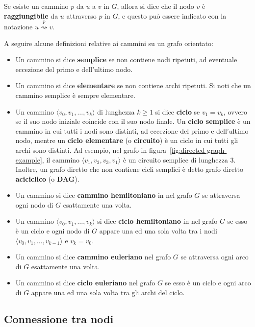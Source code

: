 Se esiste un cammino $p$ da $u$ a $v$ in $G$, allora si dice che il nodo $v$ \`e \textbf{raggiungibile} da $u$
attraverso $p$ in $G$, e questo pu\`o essere indicato con la notazione $u \overset{p}{\rightsquigarrow} v$. \newline

A seguire alcune definizioni relative ai cammini su un grafo orientato:

\begin{itemize}
    \item Un cammino si dice \textbf{semplice} se non contiene nodi ripetuti, ad eventuale eccezione del primo e
    dell'ultimo nodo.
    \item Un cammino si dice \textbf{elementare} se non contiene archi ripetuti. Si noti che un cammino semplice \`e
    sempre elementare.
    \item Un cammino $\langle v_0, v_1, \ldots, v_k \rangle$ di lunghezza $k \geq 1$ si dice \textbf{ciclo} se $v_1 = v_k$, ovvero se il
    suo nodo iniziale coincide con il suo nodo finale.
    Un \textbf{ciclo semplice} \`e un cammino in cui tutti i nodi sono distinti, ad eccezione del primo e dell'ultimo
    nodo, mentre un \textbf{ciclo elementare} (o \textbf{circuito}) \`e un ciclo in cui tutti gli archi sono distinti.
    Ad esempio, nel grafo in figura~\ref{fig:directed-graph-example}, il cammino $\langle v_1, v_2, v_3, v_1 \rangle$
    \`e un circuito semplice di lunghezza 3.
    Inoltre, un grafo diretto che non contiene cicli semplici \`e detto grafo diretto \textbf{aciciclico} (o
    \textbf{DAG}).
    \item Un cammino si dice \textbf{cammino hemiltoniano} in nel grafo $G$ se attraversa ogni nodo di $G$ esattamente
    una volta.
    \item Un cammino $\langle v_0, v_1, \ldots, v_k \rangle$ si dice \textbf{ciclo hemiltoniano} in nel grafo $G$ se
    esso \`e un ciclo e ogni nodo di $G$ appare una ed una sola volta tra i nodi $\langle v_0, v_1, \ldots,
    v_{k-1}\rangle$ e $v_k = v_0$.
    \item Un cammino si dice \textbf{cammino euleriano} nel grafo $G$ se attraversa ogni arco di $G$ esattamente una
    volta.
    \item Un cammino si dice \textbf{ciclo euleriano} nel grafo $G$ se esso \`e un ciclo e ogni arco di $G$ appare una
    ed una sola volta tra gli archi del ciclo.
\end{itemize}

\subsection{Connessione tra nodi}\label{subsec:connessione-tra-nodi}

